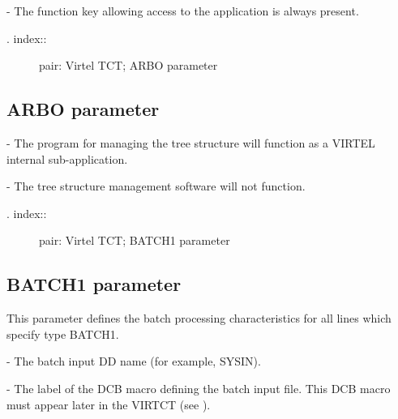 \documentclass[letterpaper,10pt,english]{sphinxmanual}
\begin{document}
 - The function key allowing access to the application is always present.
\begin{description}
\item[{. index::}] \leavevmode
pair: Virtel TCT; ARBO parameter

\end{description}


\subsection{ARBO parameter}
\label{\detokenize{Installation_Guide:arbo-parameter}}
\begin{sphinxVerbatim}[commandchars=\\\{\}]
 
\end{sphinxVerbatim}

 - The program for managing the tree structure will function as a VIRTEL internal sub-application.

 - The tree structure management software will not function.
\begin{description}
\item[{. index::}] \leavevmode
pair: Virtel TCT; BATCH1 parameter

\end{description}


\subsection{BATCH1 parameter}
\label{\detokenize{Installation_Guide:batch1-parameter}}
\begin{sphinxVerbatim}[commandchars=\\\{\}]
   
\end{sphinxVerbatim}

This parameter defines the batch processing characteristics for all lines which specify type BATCH1.

 - The batch input DD name (for example, SYSIN).

 - The label of the DCB macro defining the batch input file. This DCB macro must appear later in the VIRTCT (see {\hyperref[\detokenize{Installation_Guide:v457ig-bookmark72}]{}}).
\end{document}
